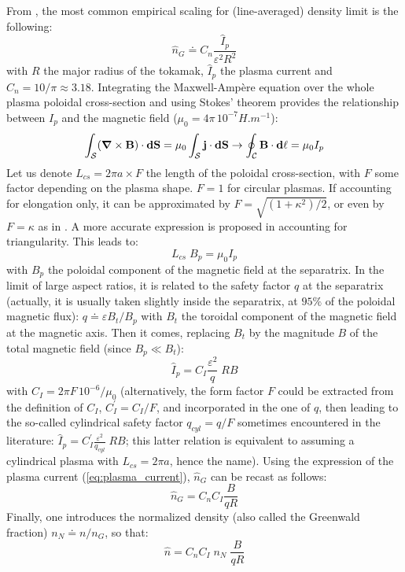 \documentclass[12pt]{iopart}
\newcommand{\jbf}{{\mathbf j}}
\newcommand{\Bbf}{{\mathbf B}}
\newcommand{\nablabf}{\mbox{\boldmath${\nabla}$}}
\begin{document}
From \cite[eq.(14.146)]{Freidberg2007}, the most common empirical scaling for (line-averaged) density limit is the following:
\begin{equation}
\widehat n_G \doteq C_n \frac{\widehat I_p}{\varepsilon^2 R^2}
\label{eq:greenwald_density}
\end{equation}
with $R$ the major radius of the tokamak, $\widehat I_p$ the plasma current and $C_n = 10/\pi \approx 3.18$.
Integrating the Maxwell-Amp\`ere equation over the whole plasma poloidal cross-section and using Stokes' theorem provides the relationship between $I_p$ and the magnetic field ($\mu_0 = 4\pi\, 10^{-7} {H.m^{-1}}$):
\begin{equation*}
\int_\mathcal{S} (\nablabf\times \Bbf) \cdot \mathbf{dS}
= \mu_0 \int_\mathcal{S} \jbf \cdot \mathbf{dS}
\to
\oint_\mathcal{C} \mathbf{B} \cdot \mathbf{d\ell} = \mu_0 I_p
\end{equation*}
Let us denote $L_{cs}=2\pi a \times F$ the length of the poloidal cross-section, with $F$ some factor depending on the plasma shape. $F=1$ for circular plasmas. If accounting for elongation only, it can be approximated by $F= \sqrt{(1+\kappa^2)/2}$, or even by $F=\kappa$ as in \cite{ITERphysics_chap2}. A more accurate expression is proposed in \cite[eq.17]{Johner2011} accounting for triangularity. This leads to:
\begin{equation*}
  L_{cs}\; B_p = \mu_0 I_p
\end{equation*}
with $B_p$ the poloidal component of the magnetic field at the separatrix. In the limit of large aspect ratios, it is related to the safety factor $q$ at the separatrix (actually, it is usually taken slightly inside the separatrix, at $95\%$ of the poloidal magnetic flux): $q \doteq \varepsilon B_t / B_p$ with $B_t$ the toroidal component of the magnetic field at the magnetic axis. Then it comes, replacing $B_t$ by the magnitude $B$ of the total magnetic field (since $B_p\ll B_t$):
\begin{equation}
\widehat I_p = C_I \frac{\varepsilon^2}{q} \; R B
\label{eq:plasma_current}
\end{equation}
with $C_I = 2\pi F\, 10^{-6} /\mu_0$ (alternatively, the form factor $F$ could be extracted from the definition of $C_I$, $C^\prime_I = C_I/F$, and incorporated in the one of $q$, then leading to the so-called cylindrical safety factor $q_{cyl} = q/F$ sometimes encountered in the literature: $\widehat I_p = C^\prime_I \frac{\varepsilon^2}{q_{cyl}} \; R B$; this latter relation is equivalent to assuming a cylindrical plasma with $L_{cs}=2\pi a$, hence the name). 
Using the expression of the plasma current (\ref{eq:plasma_current}), $\widehat n_G$ can be recast as follows:
\begin{equation*}
\widehat n_G = C_nC_I \frac{B}{qR}
\end{equation*}
Finally, one introduces the normalized density (also called the Greenwald fraction) $n_N\doteq n/ n_G$, so that:
\begin{equation}
\widehat n = C_nC_I\; n_N\; \frac{B}{qR}
\label{eq:n_nN}
\end{equation}
\end{document}
